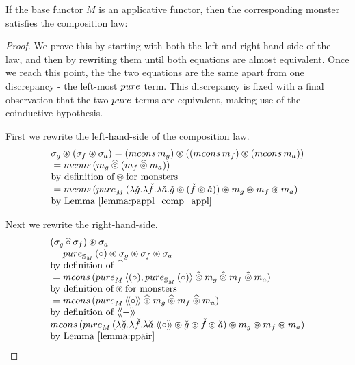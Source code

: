 \begin{lemma}
If the base functor $M$ is an applicative functor, then the corresponding monster satisfies the composition law:
\begin{proof}

We prove this by starting with both the left and right-hand-side of the law, and then by rewriting them until both equations are almost equivalent. Once we reach this point, the the two equations are the same apart from one discrepancy - the left-most $\apure$ term. This discrepancy is fixed with a final observation that the two $\apure$ terms are equivalent, making use of the coinductive hypothesis.

First we rewrite the left-hand-side of the composition law. 
$$
\begin{array}{ll}
\sigma_g \appl (\sigma_f \appl \sigma_a)
 = (\mcons\,m_g) \appl ((\mcons\,m_f) \appl (\mcons\,m_a))\\
{}= \mcons\,(m_g \alift{\pappl} (m_f \alift{\pappl} m_a)) \\
\mbox{by definition of}\appl\mbox{for monsters} \\
{}= \mcons\,(
\apure_M\, (\lambda \pstr{g}. \lambda \pstr{f}. \lambda \pstr{a}. \pstr{g} \pappl (\pstr{f}\pappl \pstr{a})) \appl m_g \appl m_f \appl m_a
)\\
\mbox{by Lemma \ref{lemma:pappl_comp_appl}}
\end{array}
$$

Next we rewrite the right-hand-side.
$$
\begin{array}{ll}
(\sigma_g \alift{\comp} \sigma_f) \appl \sigma_a \\
{}= \apure_{\stream{M}}\,(\comp) \appl \sigma_g \appl \sigma_f \appl \sigma_a \\
\mbox{by definition of }\alift{-}\\
{}= \mcons\, (\apure_M\,\pair{(\comp)}{\apure_{\stream{M}}\,(\comp)} \alift{\pappl} m_g \alift{\pappl} m_f \alift{\pappl} m_a)\\
\mbox{by definition of}\appl\mbox{for monsters}\\
{}= \mcons\, (\apure_M\,\ppair{\comp} \alift{\pappl} m_g \alift{\pappl} m_f \alift{\pappl} m_a)\\
\mbox{by definition of }\ppair{-}\\
\mcons\,(
\apure_M\,(\lambda \pstr{g}. \lambda \pstr{f}. \lambda \pstr{a}. \ppair{\comp} \pappl \pstr{g}  \pappl \pstr{f}  \pappl \pstr{a}) \appl m_g \appl m_f \appl m_a) \\
\mbox{by Lemma \ref{lemma:ppair}}
\end{array}
$$


\end{proof}
\end{lemma}
